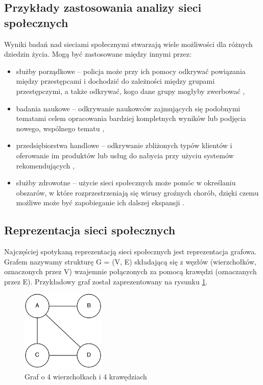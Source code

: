 \subsection{Przykłady zastosowania analizy sieci społecznych}
Wyniki badań nad sieciami społecznymi stwarzają wiele możliwości dla różnych
dziedzin życia. Mogą być zastosowane między innymi przez:
\begin{itemize}
  \item służby porządkowe -- policja może przy ich pomocy odkrywać powiązania
  między przestępcami i dochodzić do zależności między grupami przestępczymi,
  a także odkrywać, kogo dane grupy mogłyby zwerbować \cite{SNACriminal},
  
  \item badania naukowe -- odkrywanie naukowców zajmujących się podobnymi
  tematami celem opracowania bardziej kompletnych wyników lub podjęcia nowego,
  wspólnego tematu \cite{SNAScientists},
  
  \item przedsiębiorstwa handlowe -- odkrywanie zbliżonych typów klientów i 
  oferowanie im produktów lub usług do nabycia przy użyciu systemów 
  rekomendujących \cite{SNAReccomendation},
  
  \item służby zdrowotne -- użycie sieci społecznych może pomóc w określaniu
  obszarów, w które rozprzestrzeniają się wirusy groźnych chorób, dzięki czemu
  możliwe może być zapobieganie ich dalszej ekspansji \cite{SNAEpidemic}.
  
    
\end{itemize}



\subsection{Reprezentacja sieci społecznych}
Najczęściej spotykaną reprezentacją sieci społecznych jest reprezentacja
grafowa. Grafem nazywamy strukturę G = (V, E) składającą się z węzłów
(wierzchołków, oznaczonych przez V) wzajemnie połączonych za pomocą krawędzi
(oznaczanych przez E). Przykładowy graf został zaprezentowany na rysunku
\ref{image:graf-zwykly}.

\begin{figure}[ht!]
\centering
\includegraphics[width=40mm]{img/graf-zwykly.png}
\caption{Graf o 4 wierzchołkach i 4 krawędziach}
\label{image:graf-zwykly}
\end{figure}

